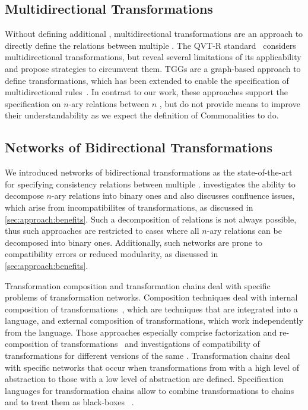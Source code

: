 \subsection*{Multidirectional Transformations}

Without defining additional \metamodels, multidirectional transformations are an approach to directly define the relations between multiple \metamodels.
The QVT-R standard~\cite{qvt} considers multidirectional transformations, but \textcite{macedo2014a} reveal several limitations of its applicability and propose strategies to circumvent them.
\acp{TGG} are a graph-based approach to define transformations, which has been extended to enable the specification of multidirectional rules~\cite{trollmann2015a, trollmann2016a}.
In contrast to our work, these approaches support the specification on $n$-ary relations between $n$ \metamodels, but do not provide means to improve their understandability as we expect the definition of Commonalities to do.


\subsection*{Networks of Bidirectional Transformations}

We introduced networks of bidirectional transformations as the state-of-the-art for specifying consistency relations between multiple \metamodels.
\textcite{stevens2017a} investigates the ability to decompose $n$-ary relations into binary ones and also discusses confluence issues, which arise from incompatibilites of transformations, as discussed in \autoref{sec:approach:benefits}.
Such a decomposition of relations is not always possible, thus such approaches are restricted to cases where all $n$-ary relations can be decomposed into binary ones.
Additionally, such networks are prone to compatibility errors or reduced modularity, as discussed in \autoref{sec:approach:benefits}.

Transformation composition and transformation chains deal with specific problems of transformation networks.
Composition techniques deal with internal composition of transformations~\cite{wagelaar2008a}, which are techniques that are integrated into a language, and external composition of transformations, which work independently from the language.
Those approaches especially comprise factorization and re-composition of transformations~\cite{cuadrado2008a} and investigations of compatibility of transformations for different versions of the same \metamodels.
Transformation chains deal with specific networks that occur when transformations from \metamodels with a high level of abstraction to those with a low level of abstraction are defined.
Specification languages for transformation chains %
allow to combine transformations to chains~\cite{lucio2013a} and to treat them as black-boxes%
~\cite{vanhooff2006a, vanhooff2007a}. 



